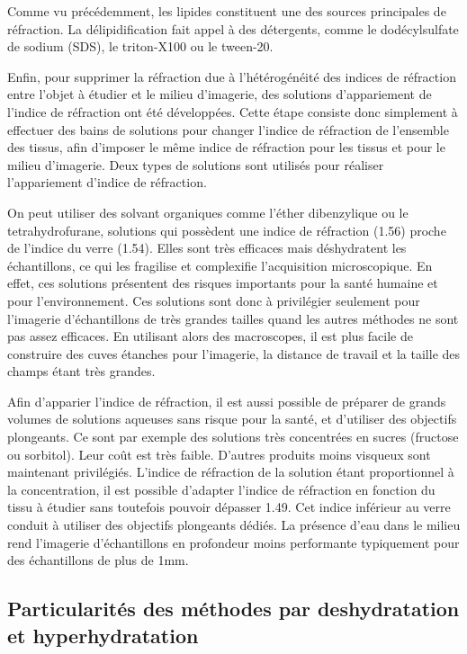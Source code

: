 \documentclass[\main/main.tex]{subfiles}
\begin{document}
Comme vu précédemment, les lipides constituent une des sources principales de réfraction. %
%
La délipidification fait appel à des détergents, comme le dodécylsulfate de sodium (SDS), le triton-X100 ou le tween-20.

%
Enfin, pour supprimer la réfraction due à l'hétérogénéité des indices de réfraction entre l'objet à étudier et le milieu d'imagerie, des solutions d'appariement de l'indice de réfraction ont été développées.
%
Cette étape consiste donc simplement à effectuer des bains de solutions pour changer l'indice de réfraction de l'ensemble des tissus, afin d'imposer le même indice de réfraction pour les tissus et pour le milieu d'imagerie.
%
Deux types de solutions sont utilisés pour réaliser l'appariement d'indice de réfraction.

%
On peut utiliser des solvant organiques comme l'éther dibenzylique ou le tetrahydrofurane, solutions qui possèdent une indice de réfraction (1.56) proche de l'indice du verre (1.54).
%
Elles sont très efficaces mais déshydratent les échantillons, ce qui les fragilise et complexifie l'acquisition microscopique. En effet, ces solutions présentent des risques importants pour la santé humaine et pour l'environnement.
%
Ces solutions sont donc à privilégier seulement pour l'imagerie d'échantillons de très grandes tailles quand les autres méthodes ne sont pas assez efficaces. En utilisant alors des macroscopes, il est plus facile de construire des cuves étanches pour l'imagerie, la distance de travail et la taille des champs étant très grandes. 

%
Afin d'apparier l'indice de réfraction, il est aussi possible de préparer de grands volumes de solutions aqueuses sans risque pour la santé, et d'utiliser des objectifs plongeants. Ce sont par exemple des solutions très concentrées en sucres (fructose ou sorbitol). Leur coût est très faible. D'autres produits moins visqueux sont maintenant privilégiés.
%
L'indice de réfraction de la solution étant proportionnel à la concentration, il est possible d'adapter l'indice de réfraction en fonction du tissu à étudier  sans toutefois pouvoir dépasser 1.49. Cet indice inférieur au verre conduit à utiliser des objectifs plongeants dédiés. La présence d'eau dans le milieu rend l'imagerie d'échantillons en profondeur moins performante typiquement pour des échantillons de plus de 1mm.

\subsection{Particularités des méthodes par deshydratation et hyperhydratation}
\end{document}
